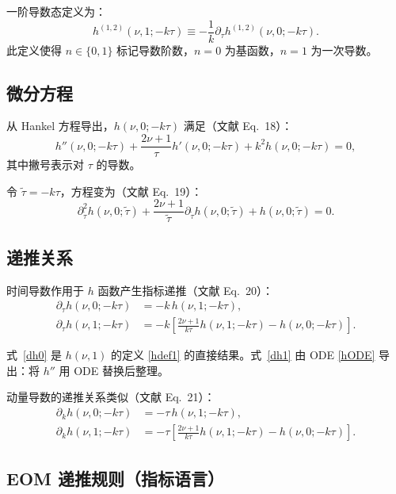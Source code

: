 ﻿\documentclass[a4paper,11pt]{article}
\begin{document}
一阶导数态定义为：
\begin{equation}
  h^{(1,2)}(\nu, 1; -k\tau) \equiv -\frac{1}{k} \partial_\tau h^{(1,2)}(\nu, 0; -k\tau).
  \label{hdef1}
\end{equation}
此定义使得 $n \in \{0, 1\}$ 标记导数阶数，$n=0$ 为基函数，$n=1$ 为一次导数。

\subsection{微分方程}

从 Hankel 方程导出，$h(\nu, 0; -k\tau)$ 满足（文献 Eq.~18）：
\begin{equation}
  h''(\nu, 0; -k\tau) + \frac{2\nu+1}{\tau} h'(\nu, 0; -k\tau) + k^2 h(\nu, 0; -k\tau) = 0,
  \label{hODE}
\end{equation}
其中撇号表示对 $\tau$ 的导数。

令 $\tilde{\tau} = -k\tau$，方程变为（文献 Eq.~19）：
\begin{equation}
  \partial_{\tilde{\tau}}^2 h(\nu, 0; \tilde{\tau}) + \frac{2\nu+1}{\tilde{\tau}} \partial_{\tilde{\tau}} h(\nu, 0; \tilde{\tau}) + h(\nu, 0; \tilde{\tau}) = 0.
  \label{hODEtilde}
\end{equation}

\subsection{递推关系}

时间导数作用于 $h$ 函数产生指标递推（文献 Eq.~20）：
\begin{align}
  \partial_\tau h(\nu, 0; -k\tau) &= -k\, h(\nu, 1; -k\tau), \label{dh0} \\
  \partial_\tau h(\nu, 1; -k\tau) &= -k \left[ \frac{2\nu+1}{k\tau} h(\nu, 1; -k\tau) - h(\nu, 0; -k\tau) \right]. \label{dh1}
\end{align}

式~\eqref{dh0} 是 $h(\nu,1)$ 的定义 \eqref{hdef1} 的直接结果。式~\eqref{dh1} 由 ODE \eqref{hODE} 导出：将 $h''$ 用 ODE 替换后整理。

动量导数的递推关系类似（文献 Eq.~21）：
\begin{align}
  \partial_k h(\nu, 0; -k\tau) &= -\tau\, h(\nu, 1; -k\tau), \label{dkh0} \\
  \partial_k h(\nu, 1; -k\tau) &= -\tau \left[ \frac{2\nu+1}{k\tau} h(\nu, 1; -k\tau) - h(\nu, 0; -k\tau) \right]. \label{dkh1}
\end{align}

\subsection{EOM 递推规则（指标语言）}
\end{document}
